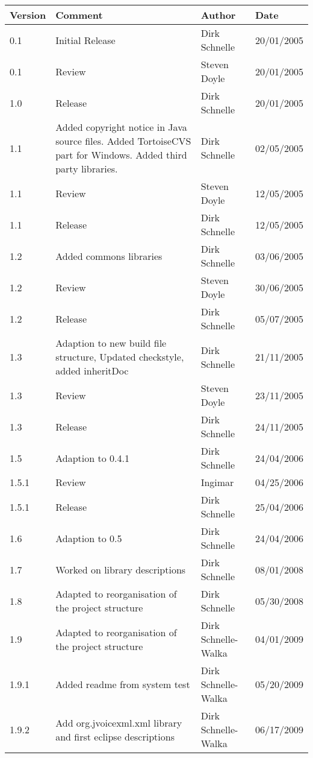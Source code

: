 \documentclass[11pt,a4paper]{article}
\begin{document}
\begin{tabular}{|l|p{5cm}|l|l|}
\hline
\textbf{Version} & \textbf{Comment} & \textbf{Author} & \textbf{Date} \\
\hline
\hline
0.1 & Initial Release & Dirk Schnelle & 20/01/2005 \\
\hline
0.1 & Review & Steven Doyle & 20/01/2005 \\
\hline
1.0 & Release & Dirk Schnelle & 20/01/2005 \\
\hline
1.1 & Added copyright notice in Java source files.
Added TortoiseCVS part for Windows.
Added third party libraries. & Dirk Schnelle & 
 02/05/2005 \\
\hline
1.1 & Review & Steven Doyle & 12/05/2005 \\
\hline
1.1 & Release & Dirk Schnelle & 12/05/2005 \\
\hline
1.2 & Added commons libraries & Dirk Schnelle & 03/06/2005 \\
\hline
1.2 & Review & Steven Doyle & 30/06/2005 \\
\hline
1.2 & Release & Dirk Schnelle & 05/07/2005 \\
\hline
1.3 & Adaption to new build file structure, Updated checkstyle, added 
inheritDoc & Dirk Schnelle & 21/11/2005 \\
\hline
1.3 & Review & Steven Doyle & 23/11/2005 \\
\hline
1.3 & Release & Dirk Schnelle & 24/11/2005 \\
\hline
1.5 & Adaption to 0.4.1  & Dirk Schnelle & 24/04/2006 \\
\hline
1.5.1 & Review & Ingimar  & 04/25/2006 \\
\hline
1.5.1 & Release  & Dirk Schnelle & 25/04/2006 \\
\hline
1.6 & Adaption to 0.5  & Dirk Schnelle & 24/04/2006 \\
\hline
1.7 & Worked on library descriptions  & Dirk Schnelle & 08/01/2008 \\
\hline
1.8 & Adapted to reorganisation of the project structure & Dirk Schnelle &
05/30/2008 \\
\hline
1.9 & Adapted to reorganisation of the project structure & Dirk Schnelle-Walka &
04/01/2009 \\
\hline
1.9.1 & Added readme from system test & Dirk Schnelle-Walka &
05/20/2009 \\
\hline
1.9.2 & Add org.jvoicexml.xml library and first eclipse descriptions & Dirk
Schnelle-Walka & 06/17/2009 \\
\hline
\end{tabular}




\end{document}
